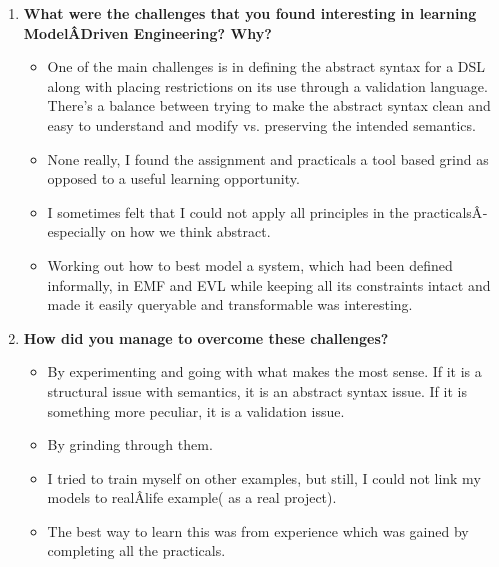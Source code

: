 \documentclass[12pt, a4paper]{report}
\begin{document}
\begin{appendices}
\begin{enumerate}
\item \textbf{ What were the challenges that you found interesting in learning ModelÂ­Driven Engineering? Why?}
\begin{itemize}
\item One of the main challenges is in defining the abstract syntax for a DSL along with placing restrictions on its use through a validation language. There's a balance between trying to make the abstract syntax clean and easy to understand and modify vs. preserving the intended semantics.
\item None really, I found the assignment and practicals a tool based grind as opposed to a useful learning opportunity.
\item I sometimes felt that I could not apply all principles in the practicalsÂ­ especially on how we think abstract.
\item Working out how to best model a system, which had been defined informally, in EMF and EVL while keeping all its constraints intact and made it easily queryable and transformable was interesting.
\end{itemize}



\item \textbf{How did you manage to overcome these challenges?}
\begin{itemize}
\item By experimenting and going with what makes the most sense. If it is a structural issue with semantics, it is an abstract syntax issue. If it is something more peculiar, it is a validation issue.
\item By grinding through them.
\item I tried to train myself on other examples, but still, I could not link my models to realÂ­life example( as a real project). 
\item The best way to learn this was from experience which was gained by completing all the practicals.
\end{itemize}



\end{enumerate}
\end{appendices}
\end{document}

